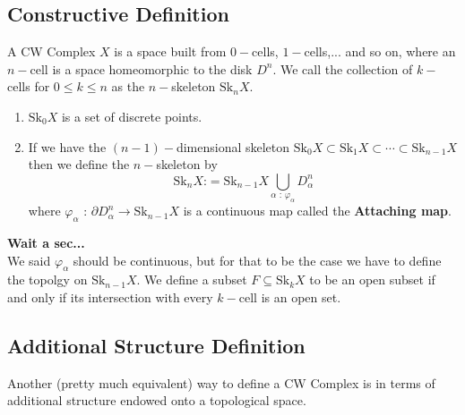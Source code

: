 \documentclass[11pt]{article}
\begin{document}
\subsection*{Constructive Definition}

\begin{bluebox}
  \begin{definition}
    A CW Complex $X$ is a space built from $0-$cells, $1-$cells,... and so on, where an $n-$cell is a space homeomorphic to the disk $D^n$. We call the collection of $k-$cells for $0 \leq k \leq n$ as the $n-$skeleton $\mathrm{Sk}_n X$.
  \begin{enumerate}
    \item $\mathrm{Sk}_0 X$ is a set of discrete points.
    \item If we have the $(n-1)-$dimensional skeleton $\mathrm{Sk}_0 X \subset \mathrm{Sk}_1 X \subset \cdots \subset \mathrm{Sk}_{n-1} X$ then we define the $n-$skeleton by $$ \mathrm{Sk}_{n} X \text{:}= \mathrm{Sk}_{n-1} X \bigcup_{\alpha \text{ : } \varphi_{\alpha}} D_{\alpha}^n $$ where $\varphi_{\alpha} \text{ : } \partial D_{\alpha}^{n} \rightarrow \mathrm{Sk}_{n-1} X$ is a continuous map called the \textbf{Attaching map}.
  \end{enumerate}
  \end{definition}
\end{bluebox}

\begin{bluebox}
  \textbf{Wait a sec...}\\
  We said $\varphi_{\alpha}$ should be continuous, but for that to be the case we have to define the topolgy on $\mathrm{Sk}_{n-1} X$. We define a subset $F \subseteq \mathrm{Sk}_{k}X$ to be an open subset if and only if its intersection with every $k-$cell is an open set. 
\end{bluebox}

\subsection*{Additional Structure Definition}
Another (pretty much equivalent) way to define a CW Complex is in terms of additional structure endowed onto a topological space. 
\end{document}
